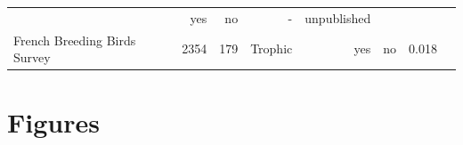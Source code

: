 \begin{longtable}[]{@{}lrrrrrrr@{}}
\begin{minipage}[t]{0.11\columnwidth}
\end{minipage} & \begin{minipage}[t]{0.05\columnwidth}\raggedleft\strut
yes\strut
\end{minipage} & \begin{minipage}[t]{0.04\columnwidth}\raggedleft\strut
no\strut
\end{minipage} & \begin{minipage}[t]{0.06\columnwidth}\raggedleft\strut
-\strut
\end{minipage} & \begin{minipage}[t]{0.22\columnwidth}\raggedleft\strut
unpublished\strut
\end{minipage}\tabularnewline
\begin{minipage}[t]{0.15\columnwidth}\raggedright\strut
French Breeding Birds Survey\strut
\end{minipage} & \begin{minipage}[t]{0.07\columnwidth}\raggedleft\strut
2354\strut
\end{minipage} & \begin{minipage}[t]{0.07\columnwidth}\raggedleft\strut
179\strut
\end{minipage} & \begin{minipage}[t]{0.11\columnwidth}\raggedleft\strut
Trophic\strut
\end{minipage} & \begin{minipage}[t]{0.05\columnwidth}\raggedleft\strut
yes\strut
\end{minipage} & \begin{minipage}[t]{0.04\columnwidth}\raggedleft\strut
no\strut
\end{minipage} & \begin{minipage}[t]{0.06\columnwidth}\raggedleft\strut
0.018\strut
\end{minipage} & \begin{minipage}[t]{0.22\columnwidth}\raggedleft\strut
\citet{Gauzere2015}\strut
\end{minipage}\tabularnewline
\bottomrule
\end{longtable}

\newpage

\section{Figures}\label{figures}

